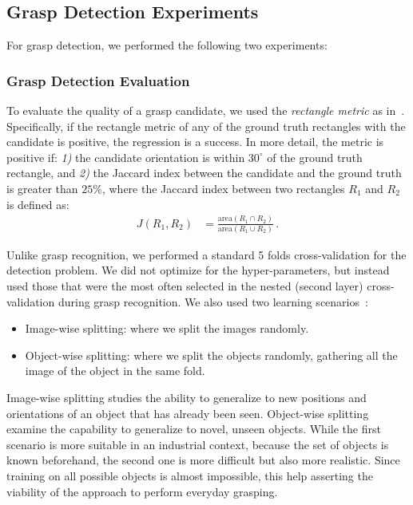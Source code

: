 \documentclass[svgnames]{scrartcl}
\begin{document}
\subsection{Grasp Detection Experiments}

For grasp detection, we performed the following two experiments:

\subsubsection{Grasp Detection Evaluation}


To evaluate the quality of a grasp candidate, we used the \textit{rectangle metric} as in~\citep{jiang2011efficient, lenz2015deep}. Specifically, if the rectangle metric of any of the ground truth rectangles with the candidate is positive, the regression is a success. In more detail, the metric is positive if: \textit{1)} the candidate orientation is within $30^{\circ}$ of the ground truth rectangle, and \textit{2)} the Jaccard index between the candidate and the ground truth is greater than $25\%$, where the Jaccard index between two rectangles $R_1$ and $R_2$ is defined as:
\begin{align}
J\left(R_1, R_2\right) &= \frac{\text{area}(R_1 \cap R_2)}{\text{area}(R_1 \cup R_2)} \, .
\end{align}




Unlike grasp recognition, we performed a standard 5 folds cross-validation for the detection problem. We did not optimize for the hyper-parameters, but instead used those that were the most often selected in the nested (second layer) cross-validation during grasp recognition. We also used two learning scenarios~\citep{lenz2015deep}:
\begin{itemize}
\item Image-wise splitting: where we split the images randomly.
\item Object-wise splitting: where we split the objects randomly, gathering all the image of the object in the same fold.
\end{itemize}

Image-wise splitting studies the ability to generalize to new positions and orientations of an object that has already been seen. Object-wise splitting examine the capability to generalize to novel, unseen objects. While the first scenario is more suitable in an industrial context, because the set of objects is known beforehand, the second one is more difficult but also more realistic. Since training on all possible objects is almost impossible, this help asserting the viability of the approach to perform everyday grasping.
\end{document}
